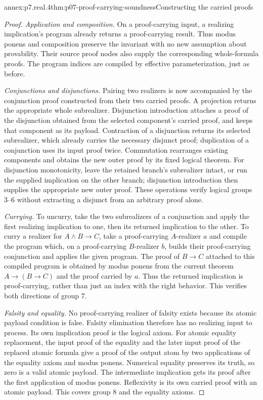 \begin{annexitem}{annex:p7.real.4}{thm:p07-proof-carrying-soundness}{Constructing the carried proofs}
\begin{proof}
\emph{Application and composition.} On a proof-carrying input, a
realizing implication's program already returns a proof-carrying result.
Thus modus ponens and composition preserve the invariant with no new
assumption about provability. Their source proof nodes also supply the
corresponding whole-formula proofs. The program indices are compiled
by effective parameterization, just as before.

\emph{Conjunctions and disjunctions.} Pairing two realizers is now
accompanied by the conjunction proof constructed from their two carried
proofs. A projection returns the appropriate whole subrealizer.
Disjunction introduction attaches a proof of the disjunction obtained
from the selected component's carried proof, and keeps that component
as its payload. Contraction of a disjunction returns its selected
subrealizer, which already carries the necessary disjunct proof;
duplication of a conjunction uses its input proof twice. Commutation
rearranges existing components and obtains the new outer proof by its
fixed logical theorem. For disjunction monotonicity, leave the retained
branch's subrealizer intact, or run the supplied implication on the
other branch; disjunction introduction then supplies the appropriate
new outer proof. These operations verify logical groups 3--6 without
extracting a disjunct from an arbitrary proof alone.

\emph{Currying.} To uncurry, take the two subrealizers of a conjunction
and apply the first realizing implication to one, then its returned
implication to the other. To curry a realizer for \(A\land B\to C\),
take a proof-carrying \(A\)-realizer \(a\) and compile the program
which, on a proof-carrying \(B\)-realizer \(b\), builds their
proof-carrying conjunction and applies the given program. The proof
of \(B\to C\) attached to this compiled program is obtained by
modus ponens from the current theorem
\(A\to(B\to C)\) and the proof carried by \(a\). Thus the
returned implication is proof-carrying, rather than just an index
with the right behavior. This verifies both directions of group 7.

\emph{Falsity and equality.} No proof-carrying realizer of falsity
exists because its atomic payload condition is false. Falsity
elimination therefore has no realizing input to process. Its own
implication proof is the logical axiom. For atomic equality replacement,
the input proof of the equality and the later input proof of the
replaced atomic formula give a proof of the output atom by two
applications of the equality axiom and modus ponens. Numerical equality
preserves its truth, so zero is a valid atomic payload. The intermediate
implication gets its proof after the first application of modus ponens.
Reflexivity is its own carried proof with an atomic payload. This
covers group 8 and the equality axioms.


\end{proof}
\end{annexitem}
